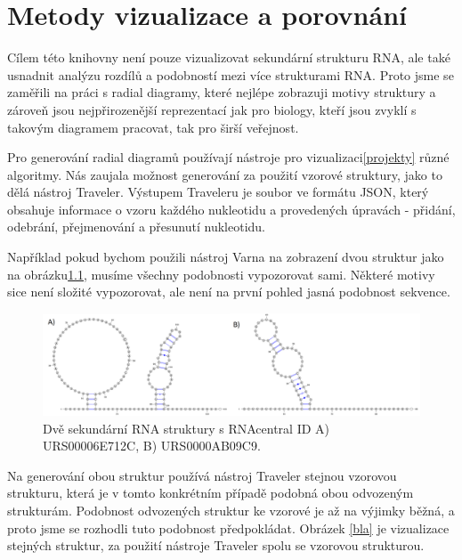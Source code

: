 
\chapter{Metody vizualizace a porovnání} \label{porovnani}

Cílem této knihovny není pouze vizualizovat sekundární strukturu RNA, ale také
usnadnit analýzu rozdílů a podobností mezi více strukturami RNA. Proto jsme se
zaměřili na práci s radial diagramy, které nejlépe zobrazuji motivy struktury
a zároveň jsou nejpřirozenější reprezentací jak pro biology, kteří jsou zvyklí
s takovým diagramem pracovat, tak pro širší veřejnost.

Pro generování radial diagramů používají nástroje pro vizualizaci\ref{projekty}
různé algoritmy. Nás zaujala možnost generování za použití vzorové struktury,
jako to dělá nástroj Traveler. Výstupem Traveleru je soubor ve formátu JSON,
který obsahuje informace o vzoru každého nukleotidu a provedených úpravách -
přidání, odebrání, přejmenování a přesunutí nukleotidu.

Například pokud bychom použili nástroj Varna na zobrazení dvou struktur jako na
obrázku\ref{dvestruktury}, musíme všechny podobnosti vypozorovat sami. Některé
motivy sice není složité vypozorovat, ale není na první pohled jasná podobnost
sekvence.

\begin{figure}[H]
  \centering
  \includegraphics[width=140mm]{../img/kap02/intro/varna.png}
  \caption[Dvě sekundární RNA struktury]{Dvě sekundární RNA struktury s
  RNAcentral ID A) URS00006E712C, B) URS0000AB09C9.}
  \label{dvestruktury}
\end{figure}

Na generování obou struktur používá nástroj Traveler stejnou vzorovou
strukturu, která je v tomto konkrétním případě podobná obou odvozeným
strukturám. Podobnost odvozených struktur ke vzorové je až na výjimky běžná, a
proto jsme se rozhodli tuto podobnost předpokládat. Obrázek \ref{bla} je
vizualizace stejných struktur, za použití nástroje Traveler spolu se vzorovou
strukturou.

